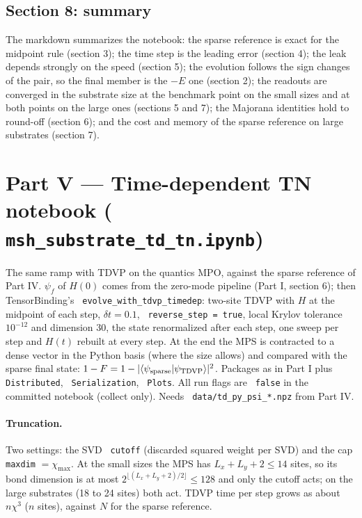\documentclass[11pt]{article}
\renewcommand{\code}[1]{\texttt{\hyphenchar\font=-1 #1}}
\begin{document}
\subsection{Section 8: summary}
The markdown summarizes the notebook: the sparse reference is exact for the midpoint rule (section 3); the time step is the leading error
(section 4); the leak depends strongly on the speed (section 5); the evolution follows the sign changes of the pair, so the final member is the
$-E$ one (section 2); the readouts are converged in the substrate size at the benchmark point on the small sizes and at both points on the large
ones (sections 5 and 7); the Majorana identities hold to round-off (section 6); and the cost and memory of the sparse reference on large
substrates (section 7).

\clearpage
\section{Part V --- Time-dependent TN notebook (\code{msh\_substrate\_td\_tn.ipynb})}

The same ramp with TDVP on the quantics MPO, against the sparse reference of Part IV. $\psi_f$ of $H(0)$ comes from the zero-mode pipeline
(Part I, section 6); then TensorBinding's \code{evolve\_with\_tdvp\_timedep}: two-site TDVP with $H$ at the midpoint of each step,
$\delta t = 0.1$, \code{reverse\_step = true}, local Krylov tolerance $10^{-12}$ and dimension 30, the state renormalized after each step, one
sweep per step and $H(t)$ rebuilt at every step. At the end the MPS is contracted to a dense vector in the Python basis (where the size allows) and
compared with the sparse final state: $1-F = 1-|\langle\psi_{\rm sparse}|\psi_{\rm TDVP}\rangle|^2$. Packages as in Part I plus \code{Distributed},
\code{Serialization}, \code{Plots}. All run flags are \code{false} in the committed notebook (collect only). Needs \code{data/td\_py\_psi\_*.npz} from Part IV.

\paragraph{Truncation.} Two settings: the SVD \code{cutoff} (discarded squared weight per SVD) and the cap \code{maxdim} $=\chi_{\max}$. At the small
sizes the MPS has $L_x+L_y+2\le14$ sites, so its bond dimension is at most $2^{\lfloor(L_x+L_y+2)/2\rfloor}\le128$ and only the cutoff acts; on the large
substrates (18 to 24 sites) both act. TDVP time per step grows as about $n\chi^3$ ($n$ sites), against $N$ for the sparse reference.
\end{document}
